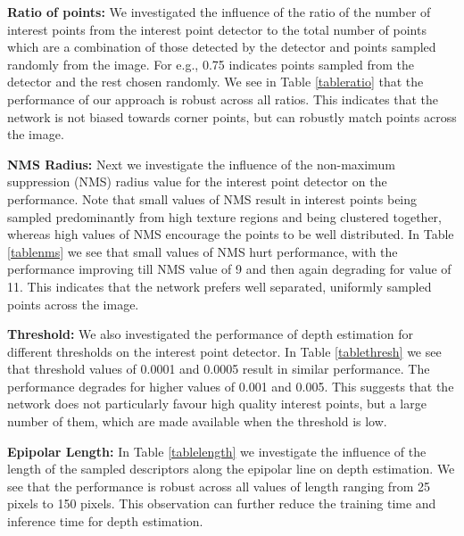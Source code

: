 \documentclass[runningheads]{llncs}
\begin{document}
\vspace{4mm}
\noindent
\textbf{Ratio of points:} We investigated the influence of the ratio of the number of interest points from the interest point detector to the total number of points which are a combination of those detected by the detector and points sampled randomly from the image. For e.g., 0.75 indicates  points sampled from the detector and the rest chosen randomly. We see in Table \ref{tableratio} that the performance of our approach is robust across all ratios. This indicates that the network is not biased towards corner points, but can robustly match points across the image. 

\vspace{4mm}
\noindent
\textbf{NMS Radius:} Next we investigate the influence of the non-maximum suppression (NMS) radius value for the interest point detector on the performance. Note that small values of NMS result in interest points being sampled predominantly from high texture regions and being clustered together, whereas high values of NMS encourage the points to be well distributed. In Table \ref{tablenms} we see that small values of NMS hurt performance, with the performance improving till NMS value of 9 and then again degrading for value of 11. This indicates that the network prefers well separated, uniformly sampled points across the image.   

\vspace{4mm}
\noindent
\textbf{Threshold:} We also investigated the performance of depth estimation for different thresholds on the interest point detector. In Table \ref{tablethresh} we see that threshold values of 0.0001 and 0.0005 result in similar performance. The performance degrades for higher values of 0.001 and 0.005. This suggests that the network does not particularly favour high quality interest points, but a large number of them, which are made available when the threshold is low. 

\vspace{4mm}
\noindent
\textbf{Epipolar Length:} In Table \ref{tablelength} we investigate the influence of the length of the sampled descriptors along the epipolar line on depth estimation. We see that the performance is robust across all values of length ranging from 25 pixels to 150 pixels. This observation can further reduce the training time and inference time for depth estimation. 
\end{document}

